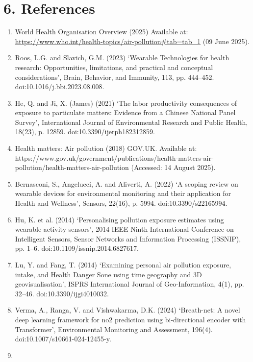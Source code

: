 \documentclass[
]{article}
\begin{document}
\hypertarget{references}{%
\section{6. References}\label{references}}

\begin{enumerate}
\def\labelenumi{\arabic{enumi}.}
\item
  World Health Organisation Overview (2025) Available at:
  \url{https://www.who.int/health-topics/air-pollution\#tab=tab_1} (09
  June 2025).
\item
  Roos, L.G. and Slavich, G.M. (2023) `Wearable Technologies for health
  research: Opportunities, limitations, and practical and conceptual
  considerations', Brain, Behavior, and Immunity, 113, pp. 444--452.
  doi:10.1016/j.bbi.2023.08.008.
\item
  He, Q. and Ji, X. (James) (2021) `The labor productivity consequences
  of exposure to particulate matters: Evidence from a Chinese National
  Panel Survey', International Journal of Environmental Research and
  Public Health, 18(23), p. 12859. doi:10.3390/ijerph182312859.
\item
  Health matters: Air pollution (2018) GOV.UK. Available at:
  https://www.gov.uk/government/publications/health-matters-air-pollution/health-matters-air-pollution
  (Accessed: 14 August 2025).
\item
  Bernasconi, S., Angelucci, A. and Aliverti, A. (2022) `A scoping
  review on wearable devices for environmental monitoring and their
  application for Health and Wellness', Sensors, 22(16), p. 5994.
  doi:10.3390/s22165994.
\item
  Hu, K. et al. (2014) `Personalising pollution exposure estimates using
  wearable activity sensors', 2014 IEEE Ninth International Conference
  on Intelligent Sensors, Sensor Networks and Information Processing
  (ISSNIP), pp. 1--6. doi:10.1109/issnip.2014.6827617.
\item
  Lu, Y. and Fang, T. (2014) `Examining personal air pollution exposure,
  intake, and Health Danger Sone using time geography and 3D
  geovisualisation', ISPRS International Journal of Geo-Information,
  4(1), pp. 32--46. doi:10.3390/ijgi4010032.
\item
  Verma, A., Ranga, V. and Vishwakarma, D.K. (2024) `Breath-net: A novel
  deep learning framework for no2 prediction using bi-directional
  encoder with Transformer', Environmental Monitoring and Assessment,
  196(4). doi:10.1007/s10661-024-12455-y.
\item

\end{enumerate}
\end{document}
